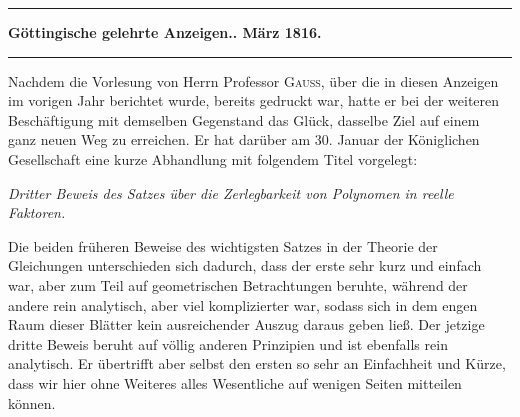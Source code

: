 \clearpage{}
\begin{center}
\rule{0.45\linewidth}{0.4pt}\par
\textbf{Göttingische gelehrte Anzeigen.. März 1816.}\par
\rule{0.45\linewidth}{0.4pt}
\end{center}

Nachdem die Vorlesung von Herrn Professor \textsc{Gauss}, über die in diesen Anzeigen im vorigen Jahr berichtet wurde, bereits gedruckt war, hatte er bei der weiteren Beschäftigung mit demselben Gegenstand das Glück, dasselbe Ziel auf einem ganz neuen Weg zu erreichen. Er hat darüber am 30. Januar der Königlichen Gesellschaft eine kurze Abhandlung mit folgendem Titel vorgelegt:

\begin{center}
\emph{Dritter Beweis des Satzes über die Zerlegbarkeit von Polynomen in reelle Faktoren.}
\end{center}

Die beiden früheren Beweise des wichtigsten Satzes in der Theorie der Gleichungen unterschieden sich dadurch, dass der erste sehr kurz und einfach war, aber zum Teil auf geometrischen Betrachtungen beruhte, während der andere rein analytisch, aber viel komplizierter war, sodass sich in dem engen Raum dieser Blätter kein ausreichender Auszug daraus geben ließ. Der jetzige dritte Beweis beruht auf völlig anderen Prinzipien und ist ebenfalls rein analytisch. Er übertrifft aber selbst den ersten so sehr an Einfachheit und Kürze, dass wir hier ohne Weiteres alles Wesentliche auf wenigen Seiten mitteilen können.

